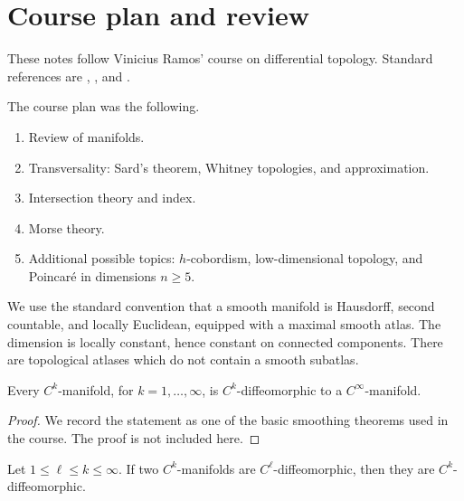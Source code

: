 \section{Course plan and review}
\label{section-course-plan-review}

\begin{reference}
These notes follow Vinicius Ramos' course on
differential topology.  Standard references
are \cite{milnordt}, \cite{muk}, and
\cite{hirsch}.
\end{reference}

\noindent
The course plan was the following.

\begin{enumerate}
\item Review of manifolds.

\item Transversality: Sard's theorem,
Whitney topologies, and approximation.

\item Intersection theory and index.

\item Morse theory.

\item Additional possible topics:
$h$-cobordism, low-dimensional topology, and
Poincar\'e in dimensions $n\geq 5$.
\end{enumerate}

\noindent
We use the standard convention that a smooth
manifold is Hausdorff, second countable, and
locally Euclidean, equipped with a maximal
smooth atlas.  The dimension is locally
constant, hence constant on connected
components.  There are topological atlases
which do not contain a smooth subatlas.

\begin{theorem}
\label{theorem-smoothing-manifolds}
Every $C^k$-manifold, for
$k=1,\ldots,\infty$, is $C^k$-diffeomorphic
to a $C^\infty$-manifold.
\end{theorem}

\begin{proof}
We record the statement as one of the basic
smoothing theorems used in the course.  The
proof is not included here.
\end{proof}

\begin{theorem}
\label{theorem-compatible-smoothings}
Let $1\leq \ell \leq k \leq \infty$.
If two $C^k$-manifolds are
$C^\ell$-diffeomorphic, then they are
$C^k$-diffeomorphic.
\end{theorem}

